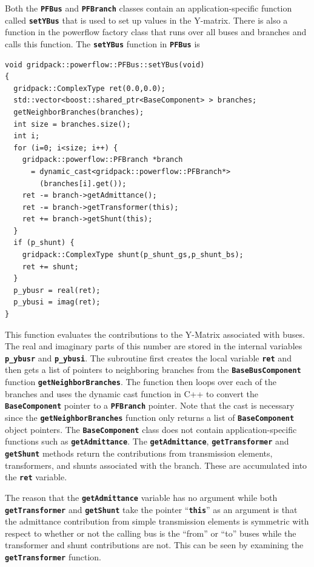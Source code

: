 Both the \texttt{\textbf{PFBus}} and \texttt{\textbf{PFBranch}} classes contain an application-specific function called \texttt{\textbf{setYBus}} that is used to set up values in the Y-matrix. There is also a function in the powerflow factory class that runs over all buses and branches and calls this function. The \texttt{\textbf{setYBus}} function in \texttt{\textbf{PFBus}} is

{
\color{red}
\begin{Verbatim}[fontseries=b]
void gridpack::powerflow::PFBus::setYBus(void)
{
  gridpack::ComplexType ret(0.0,0.0);
  std::vector<boost::shared_ptr<BaseComponent> > branches;
  getNeighborBranches(branches);
  int size = branches.size();
  int i;
  for (i=0; i<size; i++) {
    gridpack::powerflow::PFBranch *branch
      = dynamic_cast<gridpack::powerflow::PFBranch*>
        (branches[i].get());
    ret -= branch->getAdmittance();
    ret -= branch->getTransformer(this);
    ret += branch->getShunt(this);
  }
  if (p_shunt) {
    gridpack::ComplexType shunt(p_shunt_gs,p_shunt_bs);
    ret += shunt;
  }
  p_ybusr = real(ret);
  p_ybusi = imag(ret);
}
\end{Verbatim}
}

This function evaluates the contributions to the Y-Matrix associated with buses. The real and imaginary parts of this number are stored in the internal variables \texttt{\textbf{p\_ybusr}} and \texttt{\textbf{p\_ybusi}}. The subroutine first creates the local variable \texttt{\textbf{ret}} and then gets a list of pointers to neighboring branches from the \texttt{\textbf{BaseBusComponent}} function \texttt{\textbf{getNeighborBranches}}. The function then loops over each of the branches and uses the dynamic cast function in C++ to convert the \texttt{\textbf{BaseComponent}} pointer to a \texttt{\textbf{PFBranch}} pointer. Note that the cast is necessary since the \texttt{\textbf{getNeighborBranches}} function only returns a list of \texttt{\textbf{BaseComponent}} object pointers. The \texttt{\textbf{BaseComponent}} class does not contain application-specific functions such as \texttt{\textbf{getAdmittance}}. The \texttt{\textbf{getAdmittance}}, \texttt{\textbf{getTransformer}} and \texttt{\textbf{getShunt}} methods return the contributions from transmission elements, transformers, and shunts associated with the branch. These are accumulated into the \texttt{\textbf{ret}} variable.

The reason that the \texttt{\textbf{getAdmittance}} variable has no argument while both \texttt{\textbf{getTransformer}} and \texttt{\textbf{getShunt}} take the pointer ``\texttt{\textbf{this}}'' as an argument is that the admittance contribution from simple transmission elements is symmetric with respect to whether or not the calling bus is the ``from'' or ``to'' buses while the transformer and shunt contributions are not. This can be seen by examining the \texttt{\textbf{getTransformer}} function.


